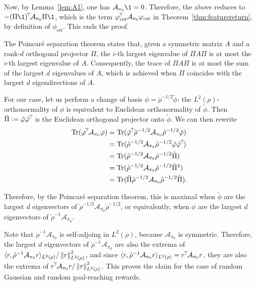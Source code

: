 \documentclass[11pt,a4paper]{article}
\newcommand{\AK}{\mathcal{A}}
\newcommand{\drho}{\grave \rho}
\begin{document}
\begin{dem}
Now, by Lemma~\ref{lem:A1}, one has $\AK_{\pi_0}\1=0$. Therefore,
the above reduces to $-\transp{(\Pi\1)}\AK_{\pi_0}\Pi\1$, which is the
term $\transp{\phi_\mathrm{cst}}\,\AK_{\pi_0}\phi_\mathrm{cst}$ in
Theorem~\ref{thm:featurereturn}, by
definition of $\phi_\mathrm{cst}$.
This ends the proof.
\end{dem}

\begin{dem}
The Poincaré separation theorem states
that, given a symmetric matrix $A$ and a rank-$d$ orthogonal projector
$\Pi$, the $i$-th largest eigenvalue of $\Pi A\Pi$ is at most the $i$-th
largest eigenvalue of $A$. Consequently, the trace of $\Pi A \Pi$ is at
most the sum of the largest $d$ eigenvalues of $A$, which is achieved
when $\Pi$ coincides with the largest $d$ eigendirections of $A$.

For our case, let us perform a change of basis $\phi=\drho^{-1/2}\tilde
\phi$: the $L^2(\rho)$-orthonormality of $\phi$ is equivalent to Euclidean
orthonormality of $\tilde \phi$. Then $\tilde \Pi\mathrel{\mathop{:}}=
\tilde {\varphi}\tilde {\varphi}^{\!\top}\!$ is the Euclidean orthogonal projector
onto $\tilde \phi$. We can then rewrite
\begin{align}
\Tr(\transp{\phi}\AK_{\pi_0} \phi)
&=\Tr(\transp{\tilde \phi} \drho^{-1/2}\AK_{\pi_0} \drho^{-1/2} \tilde \phi)
\\&=\Tr(\drho^{-1/2}\AK_{\pi_0} \drho^{-1/2} \tilde \phi\transp{\tilde
\phi})
\\&=\Tr(\drho^{-1/2}\AK_{\pi_0} \drho^{-1/2} \tilde \Pi)
\\&=\Tr(\drho^{-1/2}\AK_{\pi_0} \drho^{-1/2} \tilde \Pi^2)
\\&=\Tr(\tilde \Pi \drho^{-1/2}\AK_{\pi_0} \drho^{-1/2}\tilde \Pi).
\end{align}

Therefore, by the Poincaré separation theorem, this is
maximal when $\tilde \phi$ are the largest $d$ eigenvectors of
$\drho^{-1/2}\AK_{\pi_0}\drho^{-1/2}$, or equivalently, when $\phi$ are
the largest $d$ eigenvectors of $\drho^{-1}\AK_{\pi_0}$. 

Note that $\drho^{-1}\AK_{\pi_0}$ is self-adjoing in $L^2(\rho)$, because
$\AK_{\pi_0}$ is symmetric. Therefore, 
the largest $d$ eigenvectors of $\drho^{-1}\AK_{\pi_0}$
are also the extrema of $\langle
r,\drho^{-1}\AK_{\pi_0}r\rangle_{L^2(\rho)}/\norm{r}^2_{L^2(\rho)}$, and since
$\langle r,\drho^{-1}\AK_{\pi_0}r\rangle_{L^2(\rho)}
=
\transp{r}\AK_{\pi_0}r
$, they are also the extrema
of $\transp{r}\AK_{\pi_0}r/\norm{r}^2_{L^2(\rho)}$.
This proves the claim for the case
of random Gaussian and random goal-reaching rewards.


\end{dem}
\end{document}
